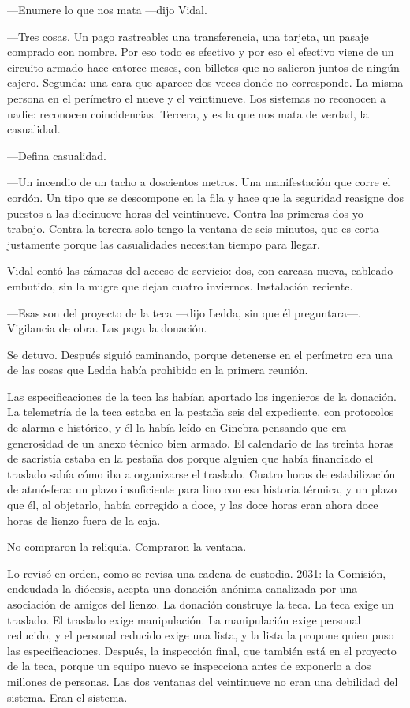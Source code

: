 ---Enumere lo que nos mata ---dijo Vidal.

---Tres cosas. Un pago rastreable: una transferencia, una tarjeta, un pasaje comprado con nombre. Por eso todo es efectivo y por eso el efectivo viene de un circuito armado hace catorce meses, con billetes que no salieron juntos de ningún cajero. Segunda: una cara que aparece dos veces donde no corresponde. La misma persona en el perímetro el nueve y el veintinueve. Los sistemas no reconocen a nadie: reconocen coincidencias. Tercera, y es la que nos mata de verdad, la casualidad.

---Defina casualidad.

---Un incendio de un tacho a doscientos metros. Una manifestación que corre el cordón. Un tipo que se descompone en la fila y hace que la seguridad reasigne dos puestos a las diecinueve horas del veintinueve. Contra las primeras dos yo trabajo. Contra la tercera solo tengo la ventana de seis minutos, que es corta justamente porque las casualidades necesitan tiempo para llegar.

Vidal contó las cámaras del acceso de servicio: dos, con carcasa nueva, cableado embutido, sin la mugre que dejan cuatro inviernos. Instalación reciente.

---Esas son del proyecto de la teca ---dijo Ledda, sin que él preguntara---. Vigilancia de obra. Las paga la donación.

Se detuvo. Después siguió caminando, porque detenerse en el perímetro era una de las cosas que Ledda había prohibido en la primera reunión.

Las especificaciones de la teca las habían aportado los ingenieros de la donación. La telemetría de la teca estaba en la pestaña seis del expediente, con protocolos de alarma e histórico, y él la había leído en Ginebra pensando que era generosidad de un anexo técnico bien armado. El calendario de las treinta horas de sacristía estaba en la pestaña dos porque alguien que había financiado el traslado sabía cómo iba a organizarse el traslado. Cuatro horas de estabilización de atmósfera: un plazo insuficiente para lino con esa historia térmica, y un plazo que él, al objetarlo, había corregido a doce, y las doce horas eran ahora doce horas de lienzo fuera de la caja.

No compraron la reliquia. Compraron la ventana.

Lo revisó en orden, como se revisa una cadena de custodia. 2031: la Comisión, endeudada la diócesis, acepta una donación anónima canalizada por una asociación de amigos del lienzo. La donación construye la teca. La teca exige un traslado. El traslado exige manipulación. La manipulación exige personal reducido, y el personal reducido exige una lista, y la lista la propone quien puso las especificaciones. Después, la inspección final, que también está en el proyecto de la teca, porque un equipo nuevo se inspecciona antes de exponerlo a dos millones de personas. Las dos ventanas del veintinueve no eran una debilidad del sistema. Eran el sistema.


